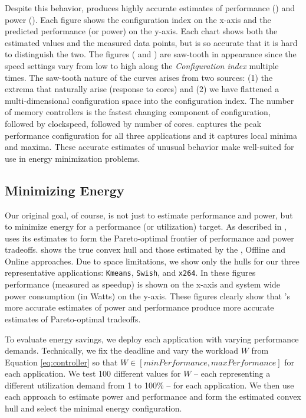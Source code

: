 Despite this behavior, \SYSTEM{} produces highly accurate estimates of
performance () and power ().  Each
figure shows the configuration index on the x-axis and the predicted
performance (or power) on the y-axis.  Each chart shows both the
estimated values and the measured data points, but \SYSTEM{} is so
accurate that it is hard to distinguish the two. The figures
( and  ) are saw-tooth in
appearance since the speed settings vary from low to high along the
\textit{Configuration index} multiple times. The saw-tooth nature of
the curves arises from two sources: (1) the extrema that naturally
arise (\eg response to cores) and (2) we have flattened a
multi-dimensional configuration space into the configuration index.
The number of memory controllers is the fastest changing component of
configuration, followed by clockspeed, followed by number of cores.
\SYSTEM{} captures the peak performance configuration for all three
applications and it captures local minima and maxima.  These accurate
estimates of unusual behavior make \SYSTEM{} well-suited for use in
energy minimization problems.

\subsection{Minimizing Energy}
\label{sec:experiment:LP}
Our original goal, of course, is not just to estimate performance and
power, but to minimize energy for a performance (or utilization)
target.  As described in , \SYSTEM{} uses its estimates to
form the Pareto-optimal frontier of performance and power tradeoffs.
 shows the true convex hull and those estimated by
the \SYSTEM{}, Offline and Online approaches.  Due to space
limitations, we show only the hulls for our three representative
applications: \texttt{Kmeans}, \texttt{Swish}, and \texttt{x264}.  In
these figures performance (measured as speedup) is shown on the x-axis
and system wide power consumption (in Watts) on the y-axis.  These
figures clearly show that \SYSTEM{}'s more accurate estimates of power
and performance produce more accurate estimates of Pareto-optimal
tradeoffs.

To evaluate energy savings, we deploy each application with varying
performance demands.  Technically, we fix the deadline and vary the
workload $W$ from Equation \ref{eq:controller} so that $W \in
[minPerformance , maxPerformance]$ for each application.  We test 100
different values for $W$ -- each representing a different utilization
demand from 1 to 100\% -- for each application.  We then use each
approach to estimate power and performance and form the estimated
convex hull and select the minimal energy configuration.

